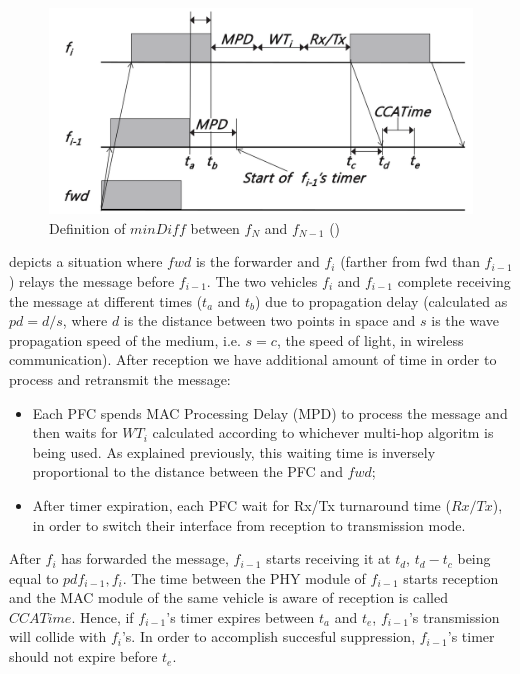 			\begin{figure}[H]
				\centering
				\includegraphics[width=\textwidth]{immagini/minDiff}
				\caption{Definition of $minDiff$ between $f_N$ and $f_{N-1}$ (\cite{6906275})}
				\label{fig:minDiff}
			\end{figure}
		
			 depicts a situation where $fwd$ is the forwarder and $f_i$ (farther from fwd than $f_{i-1}$) relays the message before $f_{i-1}$. The two vehicles $f_i$ and $f_{i-1}$ complete receiving the message at different times ($t_a$ and $t_b$) due to propagation delay (calculated as $pd = d / s$, where $d$ is the distance between two points in space and $s$ is the wave propagation speed of the medium, i.e. $s=c$, the speed of light, in wireless communication). After reception we have additional amount of time in order to process and retransmit the message:
			\begin{itemize}
				\item Each PFC spends MAC Processing Delay (MPD) to process the message and then waits for $WT_i$ calculated according to whichever multi-hop algoritm is being used. As explained previously, this waiting time is inversely proportional to the distance between the PFC and $fwd$;
				\item After timer expiration, each PFC wait for Rx/Tx turnaround time ($Rx/Tx$), in order to switch their interface from reception to transmission mode.
			\end{itemize}
			After $f_i$ has forwarded the message, $f_{i-1}$ starts receiving it at $t_d$, $t_d-t_c$  being equal to $pd{f_{i-1}, f_i}$. The time between the PHY module of $f_{i-1}$ starts reception and the MAC module of the same vehicle is aware of reception is called $CCATime$. Hence, if $f_{i-1}$'s timer expires between $t_a$ and $t_e$, $f_{i-1}$'s transmission will collide with $f_i$'s. In order to accomplish succesful suppression, $f_{i-1}$'s timer should not expire  before $t_e$. 
			
